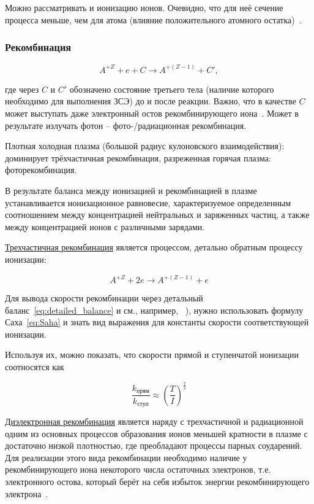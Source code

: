 \documentclass[10pt, a4paper]{article}
\begin{document}
Можно рассматривать и ионизацию ионов. Очевидно, что для неё сечение процесса меньше, чем для атома (влияние положительного атомного остатка)~\cite{raizer}.

\subsubsection{Рекомбинация} \label{subsubsec:recombination}

\begin{equation}
	A^{+Z} + e + C \rightarrow A^{+(Z-1)} + C',
\end{equation}

где через $C$ и $C'$ обозначено состояние третьего тела (наличие которого необходимо для выполнения ЗСЭ) до и после реакции. Важно, что в качестве $C$ может выступать даже электронный остов рекомбинирующего иона~\cite{astap}. Может в результате излучать фотон -- фото-/радиационная рекомбинация.

Плотная холодная плазма (большой радиус кулоновского взаимодействия): доминирует трёхчастичная рекомбинация, разреженная горячая плазма: фоторекомбинация.

В результате баланса между ионизацией и рекомбинацией в плазме устанавливается ионизационное равновесие, характеризуемое определенным соотношением между концентрацией нейтральных и заряженных частиц, а также между концентрацией
ионов с различными зарядами. 

\uline{Трехчастичная рекомбинация} является процессом, детально обратным процессу ионизации:

\begin{equation*}
	A^{+Z} + 2e \rightarrow A^{+(Z-1)} + e 
\end{equation*}

Для вывода скорости рекомбинации через детальный баланс~\eqref{eq:detailed_balance} и см., например, ~\cite{astap}), нужно использовать формулу Саха~\eqref{eq:Saha} и знать вид выражения для константы скорости соответствующей ионизации.

Используя их, можно показать, что скорости прямой и ступенчатой ионизации соотносятся как

\begin{equation}
	\frac{k_{\text{прям}}}{k_{\text{ступ}}} \approx \left(\frac{T}{I}\right)^{\frac{7}{2}}
\end{equation}

\uline{Диэлектронная рекомбинация} является наряду с трехчастичной и радиационной одним из основных процессов образования ионов меньшей кратности в плазме с достаточно низкой плотностью, где преобладают процессы парных соударений. Для реализации этого вида рекомбинации необходимо наличие у рекомбинирующего иона некоторого числа остаточных электронов, т.е. электронного остова, который берёт на себя избыток энергии рекомбинирующего электрона~\cite{astap, raizer}.
\end{document}
